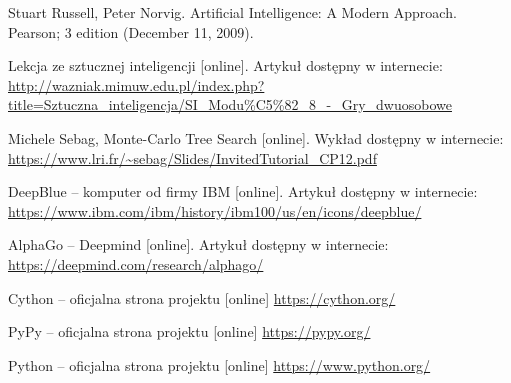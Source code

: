 \documentclass[polish,shortabstract,inz]{iithesis}
\begin{document}
\begin{thebibliography}{1}

 Stuart Russell, Peter Norvig. Artificial Intelligence: A Modern Approach. Pearson; 3 edition (December 11, 2009).

 Lekcja ze sztucznej inteligencji [online]. Artykuł dostępny w internecie:\newline
\url{http://wazniak.mimuw.edu.pl/index.php?title=Sztuczna_inteligencja/SI_Modu%C5%82_8_-_Gry_dwuosobowe}

 Michele Sebag, Monte-Carlo Tree Search [online]. Wykład dostępny w internecie:\newline
\url{https://www.lri.fr/~sebag/Slides/InvitedTutorial\_CP12.pdf}

 DeepBlue -- komputer od firmy IBM [online]. Artykuł dostępny w internecie:\newline
\url{https://www.ibm.com/ibm/history/ibm100/us/en/icons/deepblue/}

 AlphaGo -- Deepmind [online]. Artykuł dostępny w internecie:\newline
\url{https://deepmind.com/research/alphago/}

 Cython -- oficjalna strona projektu [online]
\url{https://cython.org/}

 PyPy -- oficjalna strona projektu [online]
\url{https://pypy.org/}

 Python -- oficjalna strona projektu [online]
\url{https://www.python.org/}


\end{thebibliography}
\end{document}
